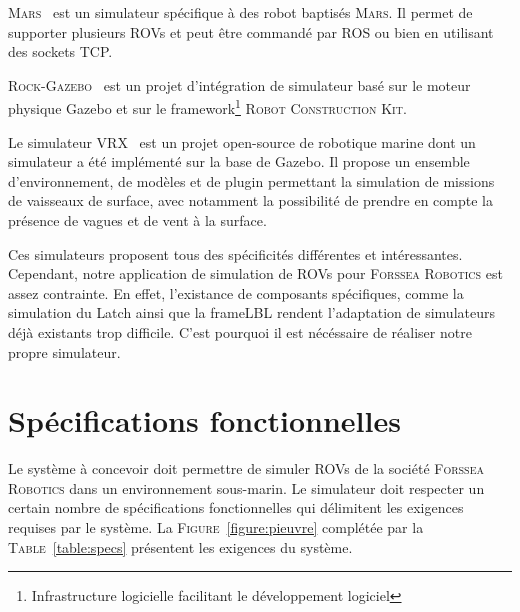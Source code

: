         \textsc{Mars}~\cite{MARS} est un simulateur spécifique à des robot baptisés \textsc{Mars}. Il permet de supporter plusieurs \gls{ROV}s et peut être commandé par \gls{ROS} ou bien en utilisant des sockets TCP.
        
        \textsc{Rock-Gazebo}~\cite{Rock} est un projet d'intégration de simulateur basé sur le moteur physique \gls{Gazebo} et sur le framework\footnote{Infrastructure logicielle facilitant le développement logiciel} \textsc{Robot Construction Kit}.
        
        Le simulateur \textsc{VRX}~\cite{bingham19toward} est un projet open-source de robotique marine dont un simulateur a été implémenté sur la base de \gls{Gazebo}. Il propose un ensemble d'environnement, de modèles et de plugin permettant la simulation de missions de vaisseaux de surface, avec notamment la possibilité de prendre en compte la présence de vagues et de vent à la surface.

        Ces simulateurs proposent tous des spécificités différentes et intéressantes. Cependant, notre application de simulation de \gls{ROV}s pour \textsc{Forssea Robotics} est assez contrainte. En effet, l'existance de composants spécifiques, comme la simulation du \gls{Latch} ainsi que la \gls{frameLBL} rendent l'adaptation de simulateurs déjà existants trop difficile. C'est pourquoi il est nécéssaire de réaliser notre propre simulateur.

    \section{Spécifications fonctionnelles}
        \label{sec:spec_fonc}

        Le système à concevoir doit permettre de simuler \gls{ROV}s de la société \textsc{Forssea Robotics} dans un environnement sous-marin. Le simulateur doit respecter un certain nombre de spécifications fonctionnelles qui délimitent les exigences requises par le système. La \textsc{Figure}~\ref{figure:pieuvre} complétée par la \textsc{Table}~\ref{table:specs} présentent les exigences du système.

